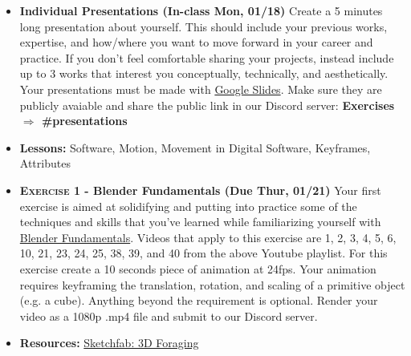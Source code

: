 \def\dMon{Mon, 01/18}
\def\dTues{Tues, 01/19}
\def\dWed{Wed, 01/20}
\def\dThur{Thur, 01/21}
\def\dFri{Fri, 01/22}
\def\dSat{Sat, 01/23}
\def\dSun{Sun, 01/24}
\placeDate

\begin{itemize}[noitemsep,topsep=0pt,leftmargin=*]
    \item \textbf{Individual Presentations (In-class \dMon)} Create a 5 minutes long presentation about yourself. This should include your previous works, expertise, and how/where you want to move forward in your career and practice. If you don't feel comfortable sharing your projects, instead include up to 3 works that interest you conceptually, technically, and aesthetically. Your presentations must be made with \href{https://docs.google.com/presentation/}{Google Slides}. Make sure they are publicly avaiable and share the public link in our Discord server: \textbf{Exercises $\Rightarrow$ \#presentations}
\end{itemize}
\vspace{1em}
\begin{itemize}[noitemsep,topsep=0pt,leftmargin=*]
    \item \textbf{Lessons:} Software, Motion, Movement in Digital Software, Keyframes, Attributes
    \item \textbf{\textsc{Exercise 1} - Blender Fundamentals (Due \dThur)} Your first exercise is aimed at solidifying and putting into practice some of the techniques and skills that you've learned while familiarizing yourself with \href{https://www.youtube.com/playlist?list=PLa1F2ddGya_-UvuAqHAksYnB0qL9yWDO6}{Blender Fundamentals}. Videos that apply to this exercise are 1, 2, 3, 4, 5, 6, 10, 21, 23, 24, 25, 38, 39, and 40 from the above Youtube playlist. For this exercise create a 10 seconds piece of animation at 24fps. Your animation requires keyframing the translation, rotation, and scaling of a primitive object (e.g. a cube). Anything beyond the requirement is optional. Render your video as a 1080p .mp4 file and submit to our Discord server.
    \item \textbf{Resources:} \href{https://sketchfab.com/search?features\=downloadable\&q\=scan+heritage\&sort\_by\=-relevance\&type\=models}{Sketchfab: 3D Foraging}
\end{itemize}